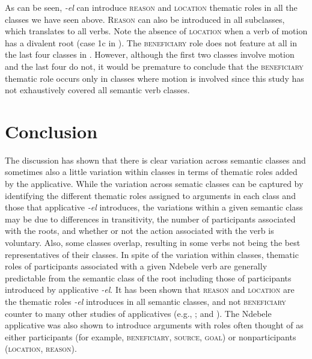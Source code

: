 \documentclass[output=paper]{langsci/langscibook}
\begin{document}
As can be seen, \textit{-el} can introduce \textsc{reason} and \textsc{location} thematic roles in all the classes we have seen above. \textsc{Reason} can also be introduced in all subclasses, which translates to all verbs. Note the absence of \textsc{location} when a verb of motion has a divalent root (case 1c in ). The \textsc{beneficiary} role does not feature at all in the last four classes in . However, although the first two classes involve motion and the last four do not, it would be premature to conclude that the \textsc{beneficiary} thematic role occurs only in classes where motion is involved since this study has not exhaustively covered all semantic verb classes.

\section{Conclusion}\label{sec:sibanda:5}

The discussion has shown that there is clear variation across semantic classes and sometimes also a little variation within classes in terms of thematic roles added by the applicative. While the variation across sematic classes can be captured by identifying the different thematic roles assigned to arguments in each class and those that applicative \textit{-el} introduces, the variations within a given semantic class may be due to differences in transitivity, the number of participants associated with the roots, and whether or not the action associated with the verb is voluntary. Also, some classes overlap, resulting in some verbs not being the best representatives of their classes. In spite of the variation within classes, thematic roles of participants associated with a given Ndebele verb are generally predictable from the semantic class of the root including those of participants introduced by applicative \textit{-el}. It has been shown that \textsc{reason} and \textsc{location} are the thematic roles \textit{-el} introduces in all semantic classes, and not \textsc{beneficiary} counter to many other studies of applicatives (e.g., \citealt{Schadeberg2003,Peterson2007,Polinsky2008,KittilaZuniga2010,deKindBostoen2012}; and \citealt{MartenKula2014}). The Ndebele applicative was also shown to introduce arguments with roles often thought of as either participants (for example, \textsc{beneficiary}, \textsc{source}, \textsc{goal}) or nonparticipants (\textsc{location}, \textsc{reason}). 
\end{document}
